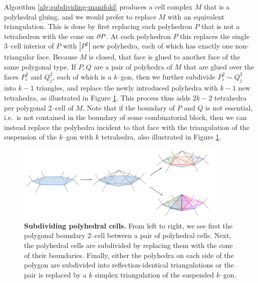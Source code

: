 
Algorithm \ref{alg:subdividing-manifold} produces a cell complex $M$ that is a polyhedral gluing, and we would prefer to replace $M$ with an equivalent triangulation.
This is done by first replacing each polyhedron $P$ that is not a tetrahedron with the cone on $\partial P$.
At each polyhedron $P$ this replaces the single 3--cell interior of $P$ with $|P^2|$ new polyhedra, each of which has exactly one non-triangular face.
Because $M$ is closed, that face is glued to another face of the same polygonal type.
If $P,Q$ are a pair of polyhedra of $M$ that are glued over the faces $P_i^2$ and $Q_j^2$, each of which is a $k$--gon, then we further subdivide $P_i^2\sim Q_j^2$ into $k-1$ triangles, and replace the newly introduced polyhedra with $k-1$ new tetrahedra, as illustrated in Figure \ref{fig:subdivide-polyhedra}.
This process thus adds $2k-2$ tetrahedra per polygonal 2--cell of $M$.
Note that if the boundary of $P$ and $Q$ is not essential, i.e.\ is not contained in the boundary of some combinatorial block, then we can instead replace the polyhedra incident to that face with the triangulation of the suspension of the $k$--gon with $k$ tetrahedra, also illustrated in Figure \ref{fig:subdivide-polyhedra}.

\begin{figure}[h!]
	\centering
	\includegraphics[width=0.9\textwidth]{figures/subdivide-polyhedra.png}
	\caption{
		\textbf{Subdividing polyhedral cells.}
		From left to right, we see first the polygonal boundary 2--cell between a pair of polyhedral cells.
		Next, the polyhedral cells are subdivided by replacing them with the cone of their boundaries.
		Finally, either the polyhedra on each side of the polygon are subdivided into reflection-identical triangulations or the pair is replaced by a $k$ simplex triangulation  of the suspended $k$--gon.
	}
	\label{fig:subdivide-polyhedra}
\end{figure}


